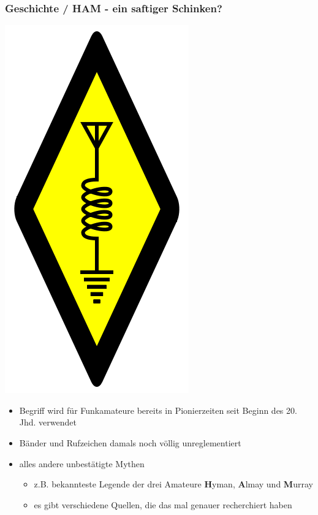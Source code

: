 \begin{frame}
    \frametitle{Geschichte / HAM - ein saftiger Schinken?}

    \begin{center}
        \includegraphics[height=0.3\textheight]{bv01/International_amateur_radio_symbol.png}
        \tiny \hyperlink{refs}{\cite{wc}}
    \end{center}

    \begin{itemize}
        \item Begriff wird für Funkamateure bereits in Pionierzeiten seit Beginn
              des 20. Jhd. verwendet
        \item Bänder und Rufzeichen damals noch völlig unreglementiert
        \item alles andere unbestätigte Mythen
        \begin{itemize}
            \item z.B. bekannteste Legende der drei Amateure \textbf{H}yman,
                  \textbf{A}lmay und \textbf{M}urray
            \item es gibt verschiedene Quellen\hyperlink{refs}{\cite{ham}},
                  die das mal genauer recherchiert haben
        \end{itemize}
    \end{itemize}

\end{frame}

